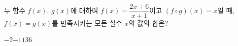 \hspace*{2mm}\begin{minipage}[t]{\dimexpr\linewidth-2mm\relax}\vspace{0pt}
두 함수 $f(x)$, $g(x)$에 대하여 $f(x)=\dfrac{2x+6}{x+1}$이고 $(f\circ g)(x)=x$일 때, $f(x)=g(x)$를 만족시키는 모든 실수 $x$의 값의 합은?
\begin{choices32}{$-2$}{$-1$}{$1$}{$3$}{$6$}\end{choices32}\end{minipage}
